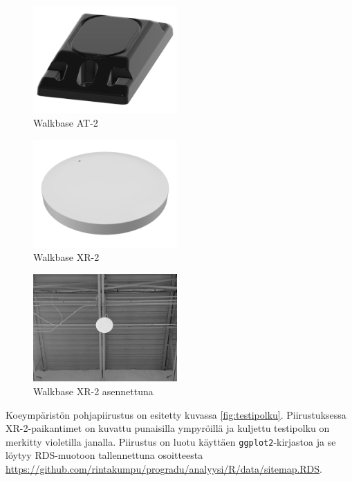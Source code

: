 \documentclass[
  12pt,
  a4paper, twoside]{book}
\begin{document}
\begin{multicols}{2}
\begin{figure}[H]
\centering
\includegraphics[width=5.5cm]{at_2}
\caption{Walkbase AT-2}
\label{fig:at2}
\end{figure}

\begin{figure}[H]
\centering
\includegraphics[width=5.5cm]{xr_2_plain}
\caption{Walkbase XR-2}
\label{fig:xr2}
\end{figure}
\end{multicols}

\begin{figure}[H]
\centering
\includegraphics[width=5.5cm]{xr_2_installed}
\caption{Walkbase XR-2 asennettuna}
\label{fig:xr2_installed}
\end{figure}

Koeympäristön pohjapiirustus on esitetty kuvassa \ref{fig:testipolku}. Piirustuksessa XR-2-paikantimet on kuvattu punaisilla ympyröillä ja kuljettu testipolku on merkitty violetilla janalla. Piirustus on luotu käyttäen \texttt{ggplot2}-kirjastoa ja se löytyy RDS-muotoon tallennettuna osoitteesta \newline \url{https://github.com/rintakumpu/progradu/analyysi/R/data/sitemap.RDS}.
\end{document}
